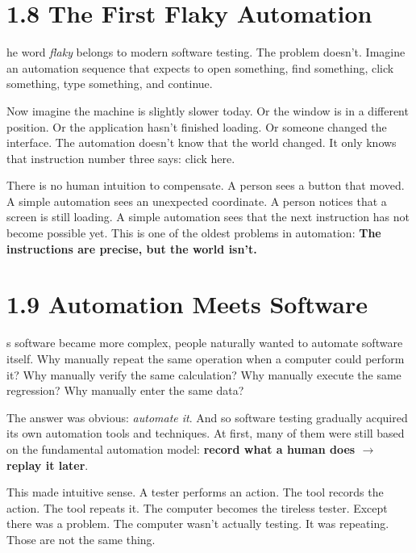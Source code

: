 \documentclass[11pt, a4paper, openany]{book}
\newcommand{\initialcap}[1]{{\fontfamily{lmss}\selectfont\huge\textbf{#1}}}
\begin{document}
\section{1.8 The First Flaky Automation}
\noindent \initialcap{T}he word \textit{flaky} belongs to modern software testing. The problem doesn't. Imagine an automation sequence that expects to open something, find something, click something, type something, and continue.

Now imagine the machine is slightly slower today. Or the window is in a different position. Or the application hasn't finished loading. Or someone changed the interface. The automation doesn't know that the world changed. It only knows that instruction number three says: click here.

There is no human intuition to compensate. A person sees a button that moved. A simple automation sees an unexpected coordinate. A person notices that a screen is still loading. A simple automation sees that the next instruction has not become possible yet. This is one of the oldest problems in automation: \textbf{The instructions are precise, but the world isn't.}

\section{1.9 Automation Meets Software}
\noindent \initialcap{A}s software became more complex, people naturally wanted to automate software itself. Why manually repeat the same operation when a computer could perform it? Why manually verify the same calculation? Why manually execute the same regression? Why manually enter the same data?

The answer was obvious: \textit{automate it}. And so software testing gradually acquired its own automation tools and techniques. At first, many of them were still based on the fundamental automation model: \textbf{record what a human does $\rightarrow$ replay it later}.

This made intuitive sense. A tester performs an action. The tool records the action. The tool repeats it. The computer becomes the tireless tester. Except there was a problem. The computer wasn't actually testing. It was repeating. Those are not the same thing.
\end{document}
